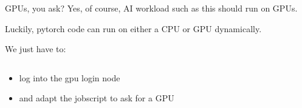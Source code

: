 \documentclass[
  10pt,
  ignorenonframetext,
  aspectratio=169]{beamer}
\newenvironment{Shaded}{\begin{snugshade}}{\end{snugshade}}
\newcommand{\ExtensionTok}[1]{\textcolor[rgb]{0.80,0.80,0.80}{#1}}
\newcommand{\KeywordTok}[1]{\textcolor[rgb]{0.94,0.87,0.69}{#1}}
\newcommand{\NormalTok}[1]{\textcolor[rgb]{0.80,0.80,0.80}{#1}}
\newcommand{\VariableTok}[1]{\textcolor[rgb]{0.80,0.80,0.80}{#1}}
\providecommand{\tightlist}{%
  \setlength{\itemsep}{0pt}\setlength{\parskip}{0pt}}
\begin{document}
\begin{frame}[fragile]{GPUs, you ask?}
\label{gpus-you-ask}
Yes, of course, AI workload such as this should run on GPUs.

\pause

Luckily, pytorch code can run on either a CPU or GPU dynamically.

\pause

We just have to:

\pause

\begin{columns}[T]
\begin{column}{0.47\linewidth}\setlength{\parskip}{0.5\baselineskip}
\begin{itemize}
\tightlist
\item
  log into the gpu login node
\end{itemize}

\begin{Shaded}
\end{Shaded}

\pause

\begin{itemize}
\tightlist
\item
  and adapt the jobscript to ask for a GPU
\end{itemize}

\begin{Shaded}
\end{Shaded}
\end{column}

\begin{column}{0.47\linewidth}\setlength{\parskip}{0.5\baselineskip}
\pause

\vspace{\baselineskip} \vspace{\baselineskip} \vspace{\baselineskip} \vspace{\baselineskip} \vspace{\baselineskip} \vspace{\baselineskip} \vspace{\baselineskip}


\end{column}
\end{columns}
\end{frame}
\end{document}
